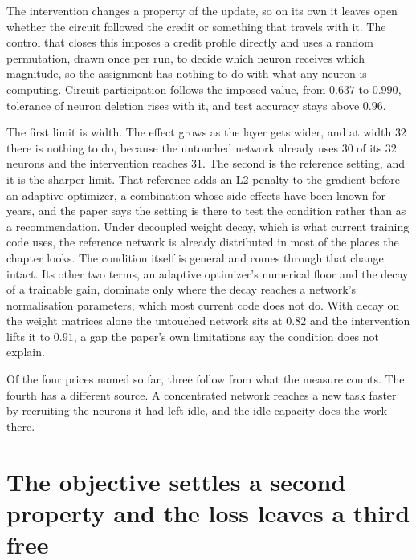 The intervention changes a property of the update, so on its own it leaves
open whether the circuit followed the credit or something that travels with
it. The control that closes this imposes a credit profile directly and uses a
random permutation, drawn once per run, to decide which neuron receives which
magnitude, so the assignment has nothing to do with what any neuron is
computing. Circuit participation follows the imposed value, from $0.637$ to
$0.990$, tolerance of neuron deletion rises with it, and test accuracy stays
above $0.96$.

The first limit is width. The effect grows as the layer gets wider, and at width $32$ there is nothing
to do, because the untouched network already uses $30$ of its $32$ neurons and
the intervention reaches $31$. The second is the reference setting, and it is
the sharper limit. That reference adds an L2 penalty to the gradient before an
adaptive optimizer, a combination whose side effects have been known for
years, and the paper says the setting is there to test the condition rather
than as a recommendation. Under decoupled weight decay, which is what current
training code uses, the reference network is already distributed in most of
the places the chapter looks. The condition itself is general and comes
through that change intact. Its other two terms, an adaptive optimizer's numerical floor and the
decay of a trainable gain, dominate only where the decay reaches a network's
normalisation parameters, which most current code does not do. With decay on
the weight matrices alone the untouched network sits at $0.82$ and the
intervention lifts it to $0.91$, a gap the paper's own limitations say the
condition does not explain.

Of the four prices named so far, three follow from what the measure counts. The fourth has a different source. A concentrated
network reaches a new task faster by recruiting the neurons it had left idle,
and the idle capacity does the work there.


\section{The objective settles a second property and the loss leaves a third free}
\label{sec:intro_others}

